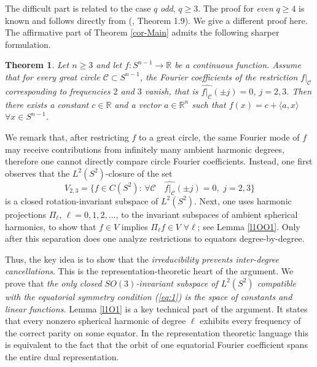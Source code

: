 \documentclass[11pt]{article}
\newtheorem{theorem}{Theorem}[section]
\theoremstyle{definition}
\begin{document}
The difficult part is related to the case $q$ {\it odd}, $q\ge 3$. The proof for  {\it even} $q\ge 4$  is known and  follows directly from (\cite{MRS}, Theorem 1.9). We give a different proof here.
The affirmative part of Theorem \ref{cor-Main} admits the following sharper formulation.

\begin{theorem}\label{FC1}
	Let $n\ge 3$ and  let   $f:S^{n-1}\to\mathbb{R}$ be a continuous function. Assume that for every great circle ${\mathcal C}\subset S^{n-1}$, the  Fourier coefficients of  the restriction  $f|_{\mathcal C}$ corresponding to frequencies $2$ and $3$ vanish, that is $\widehat{f|_{\mathcal C}}(\pm j)=0$, $j=2,3$.  
	Then there exists a constant $c\in{\mathbb R}$ and a vector $a\in{\mathbb R^n}$ such that  $f(x)=c+\langle a, x\rangle $ $\forall x\in S^{n-1}$.
\end{theorem}

We remark that,  after restricting $f$ to a great circle, the same Fourier mode of $f$ may
	receive contributions from infinitely many ambient harmonic degrees,
	 therefore one cannot directly compare circle Fourier coefficients.
	Instead, one first observes  that the $L^2(S^2)$-closure of the set 
	\begin{equation}\label{plM1}
	V_{2,3}=\{f\in C(S^{2}):\, \forall {\mathcal C}\quad \widehat{f|_{\mathcal C}}(\pm j)=0,\,\,j=2,3\}
	\end{equation}
	   is a
	closed rotation-invariant subspace of $L^2(S^2)$. Next,  one uses harmonic projections $\Pi_\ell $, $\ell=0,1,2,\dots$,  to the invariant subspaces of ambient spherical harmonics, to show that
	$	f \in V$ implies 
	$\Pi_\ell f \in V
$ $\forall \ell$; see Lemma \ref{l1OO1}.
	Only after this separation does one analyze restrictions to
	equators degree-by-degree. 
	
	
	Thus, the   key idea is to show  that 
	the {\it irreducibility prevents inter-degree cancellations}.
	This is the representation-theoretic heart of the argument.
We prove that {\it the only closed \(SO(3)\)-invariant subspace of $L^2(S^2)$ compatible with the
		equatorial symmetry condition (\ref{eq:1}) is the space of constants and linear
		functions.}
	Lemma  \ref{l1O1} is  a key technical part of the argument. It states that every nonzero spherical harmonic of degree $\ell$  exhibits every frequency of the correct
	parity on some equator. In the representation theoretic language this is equivalent to the fact that
	the orbit of one equatorial Fourier coefficient spans the entire dual representation. 
\end{document}
